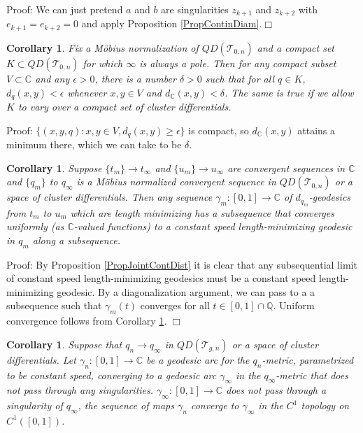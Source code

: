 \documentclass[12pt]{article}
\newtheorem{corollary}[theorem]{Corollary}
\newcommand{\qq}{\mathbb{Q}}
\newcommand{\cc}{\mathbb{C}}
\begin{document}
\noindent Proof: We can just pretend $a$ and $b$ are singularities $z_{k+1}$ and $z_{k+2}$ with $e_{k+1} = e_{k+2} = 0$ and apply Proposition \ref{PropContinDiam}.$\Box$

\begin{corollary}\label{CoroEquicont} Fix a M\"obius normalization of $QD(\mathcal{T}_{0,n})$ and a compact set $K \subset QD(\mathcal{T}_{0,n})$ for which $\infty$ is always a pole. Then for any compact subset $V \subset \cc$ and any $\epsilon > 0$, there is a number $\delta > 0$ such that for all $q \in K$, $d_q(x,y) < \epsilon$ whenever $x,y \in V$ and $d_\cc(x,y) < \delta$. The same is true if we allow $K$ to vary over a compact set of cluster differentials. \end{corollary}

\noindent Proof: $\{(x,y,q): x,y \in V, d_q(x,y) \geq \epsilon\}$ is compact, so $d_\cc(x,y)$ attains a minimum there, which we can take to be $\delta$.

\begin{corollary}\label{CoroHausCont} Suppose $\{t_m\} \to t_\infty$ and $\{u_m\} \to u_\infty$ are convergent sequences in $\cc$ and $\{q_m\}$ to $q_\infty$ is a M\"obius normalized convergent sequence in $QD(\mathcal{T}_{0,n})$ or a space of cluster differentials. Then any sequence $\gamma_m: [0,1] \to \cc$ of $d_{q_m}$-geodesics from $t_m$ to $u_m$ which are length minimizing has a subsequence that converges uniformly (as $\cc$-valued functions) to a constant speed length-minimizing geodesic in $q_m$ along a subsequence.\end{corollary}

\noindent Proof: By Proposition \ref{PropJointContDist} it is clear that any subsequential limit of constant speed length-minimizing geodesics must be a constant speed length-minimizing geodesic. By a diagonalization argument, we can pass to a a subsequence such that $\gamma_m(t)$ converges for all $t \in [0,1] \cap \qq.$ Uniform convergence follows from Corollary \ref{CoroEquicont}. $\Box$\\

\begin{corollary}\label{CoroC1}Suppose that $q_n \to q_\infty$ in $QD(\mathcal{T}_{g,n})$ or a space of cluster differentials. Let $\gamma_n: [0,1] \to \cc$ be a geodesic arc for the $q_n$-metric, parametrized to be constant speed, converging to a gedoesic arc $\gamma_\infty$ in the $q_\infty$-metric that does not pass through any singularities. $\gamma_\infty: [0,1] \to \cc$ does not pass through a singularity of $q_\infty$, the sequence of maps $\gamma_n$ converge to $\gamma_\infty$ in the $C^1$ topology on $C^1([0,1])$. \end{corollary}
\end{document}
